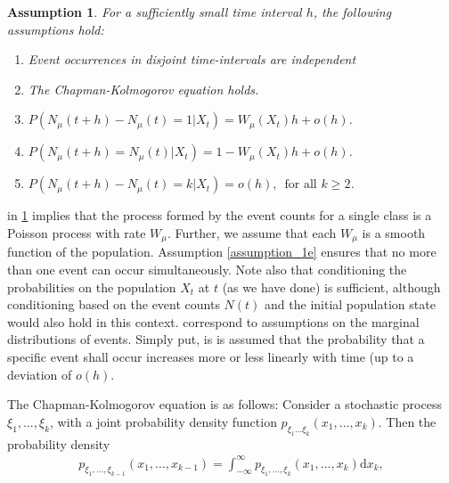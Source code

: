 \documentclass[10pt,a4paper]{article}
\newtheorem{assumption}{Assumption}
\begin{document}
\begin{assumption} For a sufficiently small time interval $h$, the following assumptions hold:
	\begin{enumerate}
		\item Event occurrences in disjoint time-intervals are independent \label{assumption_1a}

		\item The Chapman-Kolmogorov equation \cite{Kolmogoroff1931,Feller1940} holds.  \label{assumption_1b}

		\item $P\left( N_{\mu} \left( t  + h \right)  - N_{\mu} \left( t \right) = 1 | X_t \right) = W_{\mu} \left( X_t \right) h + o \left( h \right)$. \label{assumption_1c}
	
		\item $P\left( N_{\mu}\left( t+h\right) = N_{\mu} \left( t \right) | X_t \right) = 1-W_{\mu}\left( X_t \right) h + o\left( h \right)$. \label{assumption_1d}

		\item $P\left( N_{\mu}\left( t + h \right ) - N_{\mu} \left( t \right) = k | X_t \right)= o \left( h \right) , \, \textrm{ for all } k \geq 2$. \label{assumption_1e}
	\end{enumerate} \label{assumption_1}
\end{assumption}

 in \cref{assumption_1} implies that the process formed by the event counts for a single class is a Poisson process with rate $W_{\mu}$. Further, we assume that each $W_{\mu}$ is a smooth function of the population. Assumption \ref{assumption_1e} ensures that no more than one event can occur simultaneously. Note also that conditioning the probabilities on the population $X_t$ at $t$ (as we have done) is sufficient, although conditioning based on the event counts $N\left( t \right)$ and the initial population state would also hold in this context.  correspond to assumptions on the marginal distributions of events. Simply put, is is assumed that the probability that a specific event shall occur increases more or less linearly with time (up to a deviation of $o \left( h \right)$.



The Chapman-Kolmogorov equation is as follows: Consider a stochastic process $\xi_1, \ldots, \xi_k$, with a joint probability density function $p_{\xi_1 \ldots \xi_k} \left( x_1, \ldots, x_k \right)$. Then the probability density
\begin{align*}
	p_{\xi_1, \ldots, \xi_ {k-1}} \left( x_1, \ldots , x_{k-1} \right) = \int_{-\infty}^\infty p_{\xi_1, \ldots, \xi_k}\left( x_1, \ldots, x_k \right) \mathrm{d} x_k,
\end{align*}
\end{document}
